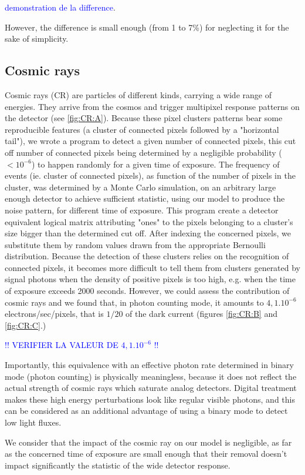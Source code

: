 \documentclass{article}
\begin{document}
\textcolor{blue}{demonstration de la difference}.\par
\medskip
However, the difference is small enough (from 1 to 7\%) for neglecting it for the sake of simplicity. 


\subsection{Cosmic rays}

Cosmic rays (CR) are particles of different kinds, carrying a wide range of energies. They arrive from the cosmos and trigger multipixel response patterns on the detector (see \ref{fig:CR:A}). 
Because these pixel clusters patterns bear some reproducible features (a cluster of connected pixels followed by a "horizontal tail"), we wrote a program to detect a given number of connected pixels, this cut off number of connected pixels being determined by a negligible probability ($<10^{-6}$) to happen randomly for a given time of exposure. The frequency of events (ie. cluster of connected pixels), as function of the number of pixels in the cluster, was determined by a Monte Carlo simulation, on an arbitrary large enough detector to achieve sufficient statistic, using our model to produce the noise pattern, for different time of exposure. This program create a detector equivalent logical matrix attributing "ones" to the pixels belonging to a cluster's size bigger than the determined cut off. After indexing the concerned pixels, we substitute them by random values drawn from the appropriate Bernoulli distribution.
Because the detection of these clusters relies on the recognition of connected pixels, it becomes more difficult to tell them from clusters generated by signal photons when the density of positive pixels is too high, e.g. when the time of exposure exceeds 2000 seconds. 
However, we could assess the contribution of cosmic rays and we found that, in photon counting mode, it amounts to $4,1.10^{-6}$ electrons/sec/pixels, that is $1/20$ of the dark current (figures \ref{fig:CR:B} and  \ref{fig:CR:C}.) \par \textcolor{blue}{!! VERIFIER LA VALEUR DE $4,1.10^{-6}$ !!}

Importantly, this equivalence with an effective photon rate determined in binary mode (photon counting) is physically meaningless, because it does not reflect the actual strength of cosmic rays which saturate analog detectors.
Digital treatment makes these high energy perturbations look like regular visible photons, and this can be considered as an additional advantage of using a binary mode to detect low light fluxes. \par
We consider that the impact of the cosmic ray on our model is negligible, as far as the concerned time of exposure are small enough that their removal doesn't impact significantly the statistic of the wide detector response.\par
%
\end{document}
